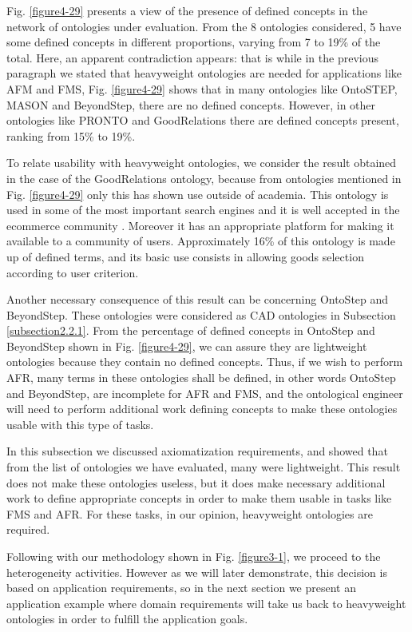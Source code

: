 Fig. \ref{figure4-29} presents a view of the presence of defined concepts in the network of ontologies under evaluation. From the 8 ontologies considered, 5 have some defined concepts in different proportions, varying from 7 to 19\% of the total. Here, an apparent contradiction appears: that is while in the previous paragraph we stated that heavyweight ontologies are needed for applications like AFM and FMS, Fig. \ref{figure4-29} shows that in many ontologies like OntoSTEP, MASON and BeyondStep, there are no defined concepts. However, in other ontologies like PRONTO and GoodRelations there are defined concepts present,  ranking from 15\% to 19\%.

To relate usability with heavyweight ontologies, we consider the result obtained in the case of the GoodRelations ontology, because from ontologies mentioned in Fig. \ref{figure4-29} only this has shown use outside of academia. This ontology is used in some of the most important   search engines and it is well accepted in the ecommerce community \citep{hepp_references_2013}. Moreover it has an appropriate platform for making it available to a community of users. Approximately 16\% of this ontology is made up of defined terms, and its basic use consists in allowing goods selection according to user criterion. 

Another necessary consequence of this result can be concerning OntoStep and BeyondStep. These ontologies were considered as CAD ontologies   in Subsection \ref{subsection2.2.1}. From the percentage of defined concepts in OntoStep and BeyondStep shown in Fig. \ref{figure4-29},  we can assure they are lightweight ontologies because they contain no defined concepts. Thus, if we wish to perform AFR, many terms in these ontologies shall be defined, in other words OntoStep and BeyondStep, are incomplete for AFR and FMS, and the ontological engineer will need to perform additional work defining concepts to make these ontologies usable with this type of tasks. 

In this subsection we discussed axiomatization requirements, and showed that from the list of ontologies we have evaluated, many were lightweight. This result does not make these ontologies useless, but it does make necessary additional work to define appropriate concepts in order to make them usable in tasks like FMS and AFR. For these tasks, in our opinion, heavyweight ontologies are required. 

Following with our methodology shown in Fig. \ref{figure3-1}, we proceed to the heterogeneity activities. However as we will later demonstrate, this decision is based on application requirements, so in the next section we present an application example where domain requirements will take us back to heavyweight ontologies in order to fulfill the application goals.  



